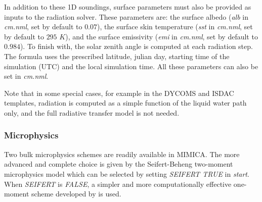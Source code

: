 \documentclass[12pt,A4,french]{article}
\begin{document}
In addition to these 1D soundings, surface parameters must also be provided as inputs to the radiation solver. These parameters are: the surface albedo ({\it alb} in {\it cm.nml}, set by default to $0.07$), the surface skin temperature ({\it sst} in {\it cm.nml}, set by default to $295$ $K$), and the surface emissivity ({\it emi} in {\it cm.nml}, set by default to $0.984$). To finish with, the solar zenith angle is computed at each radiation step. The formula uses the prescribed latitude, julian day, starting time of the simulation (UTC) and the local simulation time. All these parameters can also be set in {\it cm.nml}.

Note that in some special cases, for example in the DYCOMS and ISDAC templates, radiation is computed as a simple function of the liquid water path only, and the full radiative transfer model is not needed. 

\subsubsection{Microphysics}
\label{micro}

Two bulk microphysics schemes are readily available in MIMICA. The more advanced and complete choice is given by the Seifert-Beheng two-moment microphysics model \cite{SB2001, SB2006} which can be selected by setting {\it SEIFERT TRUE} in {\it start}. When {\it SEIFERT} is {\it FALSE}, a simpler and more computationally effective one-moment scheme developed by \cite{Gra1998} is used.
\end{document}
